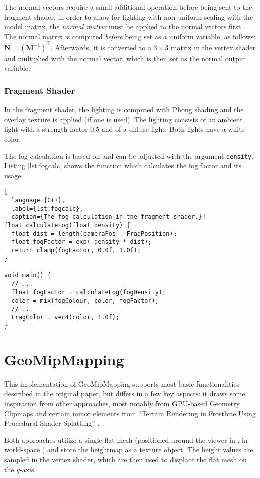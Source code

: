 The normal vectors require a small additional operation before being sent to the fragment shader:
in order to allow for lighting with non-uniform scaling with the model matrix,
the \textit{normal matrix} must be applied to the normal vectors first \cite{learnopengl}.
The normal matrix is computed \textit{before} being set as a uniform variable, as follows:
$\mathbf{N} = (\mathbf{M}^{-1})^\top$.
Afterwards, it is converted to a $3 \times 3$ matrix in the vertex shader
and multiplied with the normal vector, which is then set as the normal output variable.

\subsubsection{Fragment Shader}
In the fragment shader, the lighting is computed with Phong shading 
and the overlay texture is applied (if one is used).
The lighting consists of an ambient light with a strength factor 0.5 and 
of a diffuse light. Both lights have a white color. 

The fog calculation is based on \cite{fogcalc} and can be adjusted with the argument \texttt{density}.
Listing \ref{lst:fogcalc} shows the function which calculates the fog factor and its usage:
\begin{lstlisting}[
  language={C++},
  label={lst:fogcalc},
  caption={The fog calculation in the fragment shader.}]
float calculateFog(float density) {
  float dist = length(cameraPos - FragPosition);
  float fogFactor = exp(-density * dist);
  return clamp(fogFactor, 0.0f, 1.0f);
}

void main() {
  // ...
  float fogFactor = calculateFog(fogDensity);
  color = mix(fogColour, color, fogFactor);
  // ...
  FragColor = vec4(color, 1.0f);
}
\end{lstlisting}


\section{GeoMipMapping}
This implementation of GeoMipMapping supports most basic functionalities described in the original paper, but differs in a few key aspects:
it draws some inspiration from other approaches, most notably from GPU-based Geometry Clipmaps \cite{gpugeomclipmaps} and certain minor elements from ``Terrain Rendering in Frostbite Using Procedural Shader Splatting'' \cite{procsplattingdice}.

Both approaches utilize a single flat mesh (positioned around the viewer in \cite{gpugeomclipmaps}, in world-space \cite{procsplattingdice}) and store the heightmap as a texture object. The height values are sampled in the vertex shader, which are then 
used to displace the flat mesh on the $y$-axis. 

